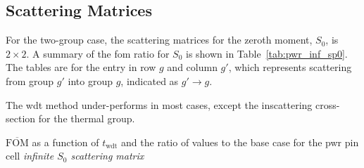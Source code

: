 \subsection{Scattering Matrices}
\label{sec:pwr_inf_total}

For the two-group case, the scattering matrices for the zeroth
moment, $S_0$, is $2 \times 2$. A summary of the \gls{fom} ratio
for $S_0$ is shown in Table~\ref{tab:pwr_inf_sp0}. The
tables are for the entry in row $g$ and column $g'$, which represents
scattering from group $g'$ into group $g$, indicated as $g' \to g$.

The \gls{wdt} method under-performs in most cases, except the
inscattering cross-section for the thermal group. 

\begin{table}[hbtp]
  \centering
  \caption[$\overline{\mathrm{FOM}}$ and ratio for
  the \acrshort{pwr} pin cell \textit{infinite $S_0$ scattering matrix}.]{$\overline{\mathrm{FOM}}$ as a function of
    $t_{\mathrm{wdt}}$ and the ratio of values to the base case for
    the \gls{pwr} pin cell \textit{infinite $S_0$ scattering matrix}}


\end{table}
